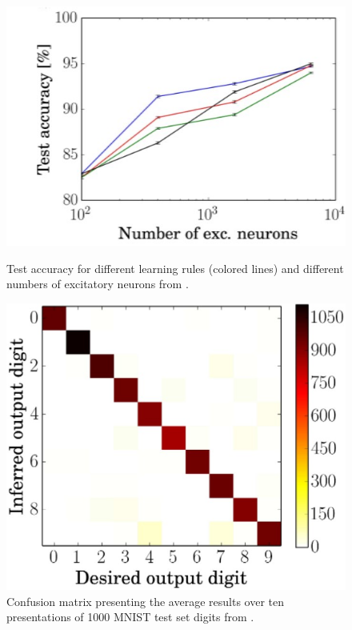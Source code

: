 \begin{figure}[http]
    \begin{minipage}[b]{.5\linewidth}
         \includegraphics[width=\linewidth]{pictures/num_exc_neurons_test_acc.jpg}
         \caption{Test accuracy for different learning rules (colored lines) and different numbers of excitatory neurons from \cite{SNN}.}
         \label{img:test_acc}
    \end{minipage}
    \hspace{0.06\linewidth}%
    \begin{minipage}[b]{.4\linewidth}
         \includegraphics[width=\linewidth]{pictures/error_analysis_confusion_matrix.jpg}
         \caption{Confusion matrix presenting the average results over ten presentations of 1000 MNIST test set digits from \cite{SNN}.}
         \label{img:error_analysis}
    \end{minipage}
\end{figure}

